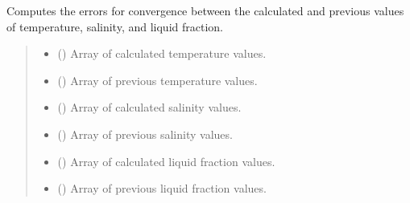 \documentclass[a4paper,11pt,english,openany]{sphinxmanual}
\begin{document}
\begin{fulllineitems}
\label{\detokenize{api/spyice.statevariables:spyice.statevariables.compute_error_for_convergence}}
\pysigstartsignatures
{}
\pysigstopsignatures
\sphinxAtStartPar
Computes the errors for convergence between the calculated and previous values of temperature, salinity, and liquid fraction.
\begin{quote}\begin{description}
\begin{itemize}
\item {} 
\sphinxAtStartPar
{} () \textendash{} Array of calculated temperature values.

\item {} 
\sphinxAtStartPar
{} () \textendash{} Array of previous temperature values.

\item {} 
\sphinxAtStartPar
{} () \textendash{} Array of calculated salinity values.

\item {} 
\sphinxAtStartPar
{} () \textendash{} Array of previous salinity values.

\item {} 
\sphinxAtStartPar
{} () \textendash{} Array of calculated liquid fraction values.

\item {} 
\sphinxAtStartPar
{} () \textendash{} Array of previous liquid fraction values.


\end{itemize}
\end{description}
\end{quote}
\end{fulllineitems}
\end{document}
